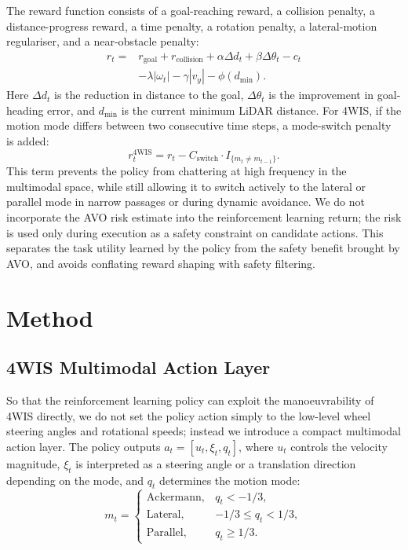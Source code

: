 \documentclass[10pt,a4paper,twocolumn]{article}
\begin{document}
The reward function consists of a goal-reaching reward, a collision penalty, a distance-progress reward, a time penalty, a rotation penalty, a lateral-motion regulariser, and a near-obstacle penalty:
\begin{equation}
\begin{aligned}
    r_t =& r_{\mathrm{goal}} + r_{\mathrm{collision}} + \alpha \Delta d_t
    + \beta \Delta \theta_t - c_t \\
    &- \lambda |\omega_t| - \gamma |v_y| - \phi(d_{\min}).
\end{aligned}
\end{equation}
Here $\Delta d_t$ is the reduction in distance to the goal, $\Delta \theta_t$ is the improvement in goal-heading error, and $d_{\min}$ is the current minimum LiDAR distance. For 4WIS, if the motion mode differs between two consecutive time steps, a mode-switch penalty is added:
\begin{equation}
    r_t^{\mathrm{4WIS}}=r_t-C_{\mathrm{switch}}\cdot I_{\{m_t\ne m_{t-1}\}}.
\end{equation}
This term prevents the policy from chattering at high frequency in the multimodal space, while still allowing it to switch actively to the lateral or parallel mode in narrow passages or during dynamic avoidance. We do not incorporate the AVO risk estimate into the reinforcement learning return; the risk is used only during execution as a safety constraint on candidate actions. This separates the task utility learned by the policy from the safety benefit brought by AVO, and avoids conflating reward shaping with safety filtering.

\section{Method}

\subsection{4WIS Multimodal Action Layer}

So that the reinforcement learning policy can exploit the manoeuvrability of 4WIS directly, we do not set the policy action simply to the low-level wheel steering angles and rotational speeds; instead we introduce a compact multimodal action layer. The policy outputs $a_t=[u_t,\xi_t,q_t]$, where $u_t$ controls the velocity magnitude, $\xi_t$ is interpreted as a steering angle or a translation direction depending on the mode, and $q_t$ determines the motion mode:
\begin{equation}
m_t=
\begin{cases}
\mathrm{Ackermann}, & q_t<-1/3,\\
\mathrm{Lateral}, & -1/3\le q_t<1/3,\\
\mathrm{Parallel}, & q_t\ge 1/3.
\end{cases}
\end{equation}
\end{document}

